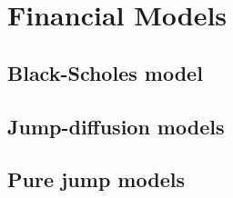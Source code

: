 \chapter{Financial Models}
\label{sec:models}


\section{Black-Scholes model}
\label{sec:models:BS}

\section{Jump-diffusion models}
\label{sec:models:jump_diffusion}

\section{Pure jump models}
\label{sec:models:pure_jump}